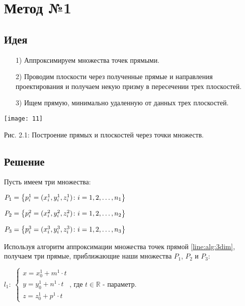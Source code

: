 \section{Метод №1}\label{meth1}

\subsection{Идея}\label{math1:idea}

\begin{itemize}
	\item[1)] Аппроксимируем множества точек прямыми.
	\item[2)] Проводим плоскости через полученные прямые и направления проектирования и получаем некую призму в пересечении трех плоскостей.
	\item[3)] Ищем прямую, минимально удаленную от данных трех плоскостей. 
\end{itemize}

\begin{center}
	\texttt{[image: 11]}

	Рис. 2.1: Построение прямых и плоскостей через точки множеств.
\end{center}

\subsection{Решение}\label{math1:solution}

Пусть имеем три множества:

\begin{center}
	$P_1 = \left\{p_i^1 = (x_i^1, y_i^1, z_i^1)\colon i=1,2,\dots,n_1\right\}$

	\vspace{0.3cm}
	$P_2 = \left\{p_i^2 = (x_i^2, y_i^2, z_i^2)\colon i=1,2,\dots,n_2\right\}$

	\vspace{0.3cm}
	$P_3 = \left\{p_i^3 = (x_i^3, y_i^3, z_i^3)\colon i=1,2,\dots,n_3\right\}$
\end{center}

Используя алгоритм аппроксимации множества точек прямой \ref{line:alg:3dim}, получаем три прямые, приближающие наши множества $P_1$, $P_2$ и $P_3$:

\begin{center}
	$\mathit{l_1}: \; \begin{cases}
		x = x_0^1 + m^1 \cdot t \\
		y = y_0^1 + n^1 \cdot t \\
		z = z_0^1 + p^1 \cdot t
	\end{cases}$, где $t \in \mathbb{R}$ - параметр. 
\end{center}


